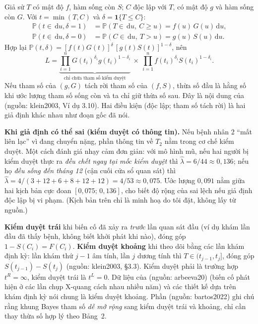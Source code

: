\documentclass[11pt,a4paper,notitlepage]{report}
\newcommand{\Prob}{\mathbb{P}}
\newcommand{\ind}{\mathbf{1}}
\newcommand{\dd}{\,\mathrm{d}}
\providecommand{\nguon}[1]{(nguồn: #1)}
\begin{document}
\begin{bosung}
Giả sử $T$ có mật độ $f$, hàm sống còn $S$; $C$ độc lập với $T$, có mật độ $g$ và hàm sống còn $G$. Với $t=\min(T,C)$ và $\delta=\ind\{T\le C\}$:
\begin{align*}
\Prob(t\in\dd u,\delta=1)&=\Prob(T\in\dd u,\ C\ge u)=f(u)\,G(u)\dd u,\\
\Prob(t\in\dd u,\delta=0)&=\Prob(C\in\dd u,\ T>u)=g(u)\,S(u)\dd u.
\end{align*}
Hợp lại $\Prob(t,\delta)=[f(t)G(t)]^{\delta}\,[g(t)S(t)]^{1-\delta}$, nên
\[
L=\underbrace{\prod_{i=1}^n G(t_i)^{\delta_i}g(t_i)^{1-\delta_i}}_{\text{chỉ chứa tham số kiểm duyệt}}\ \times\ \prod_{i=1}^n f(t_i)^{\delta_i}S(t_i)^{1-\delta_i}.
\]
Nếu tham số của $(g,G)$ tách rời tham số của $(f,S)$, thừa số đầu là hằng số khi ước lượng tham số sống còn và ta chỉ giữ thừa số sau.
Đây là nội dung của \nguon{klein2003, Ví dụ 3.10}. Hai điều kiện (độc lập; tham số tách rời) là hai giả định khác nhau như đoạn gốc đã nói.

\textbf{Khi giả định có thể sai (kiểm duyệt có thông tin).} Nếu bệnh nhân 2 ``mất liên lạc'' vì đang chuyển nặng, phần thông tin về $T_2$ nằm trong cơ chế kiểm duyệt.
Một cách đánh giá nhạy cảm đơn giản: với mô hình mũ, nếu hai người bị kiểm duyệt thực ra \emph{đều chết ngay tại mốc kiểm duyệt} thì $\hat\lambda=6/44\approx0{,}136$;
nếu họ \emph{đều sống đến tháng 12} (cận cuối cửa sổ quan sát) thì $\hat\lambda=4/(3+12+6+8+12+12)=4/53\approx0{,}075$.
Ước lượng $0{,}091$ nằm giữa hai kịch bản cực đoan $[0{,}075;\,0{,}136]$, cho biết độ rộng của sai lệch nếu giả định độc lập bị vi phạm. (Kịch bản trên chỉ là minh hoạ do tôi đặt, không lấy từ nguồn.)
\end{bosung}

\begin{bosung}
\textbf{Kiểm duyệt trái} khi biến cố đã xảy ra \emph{trước} lần quan sát đầu (ví dụ khám lần đầu đã thấy bệnh, không biết khởi phát khi nào), đóng góp $1-S(C_i)=F(C_i)$.
\textbf{Kiểm duyệt khoảng} khi theo dõi bằng các lần khám định kỳ: lần khám thứ $j-1$ âm tính, lần $j$ dương tính thì $T\in(t_{j-1},t_j]$, đóng góp $S(t_{j-1})-S(t_j)$
\nguon{klein2003, \S3.3}. Kiểm duyệt phải là trường hợp $t^R=\infty$, kiểm duyệt trái là $t^L=0$.
Dữ liệu của \nguon{arbeeva20} (biến cố phát hiện ở các lần chụp X-quang cách nhau nhiều năm) và các thiết kế dựa trên khám định kỳ nói chung là kiểm duyệt khoảng.
Phần \nguon{bartos2022} ghi chú rằng khung Bayes tham số \emph{dễ mở rộng} sang kiểm duyệt trái và khoảng, chỉ cần thay thừa số hợp lý theo Bảng~2.
\end{bosung}
\end{document}
